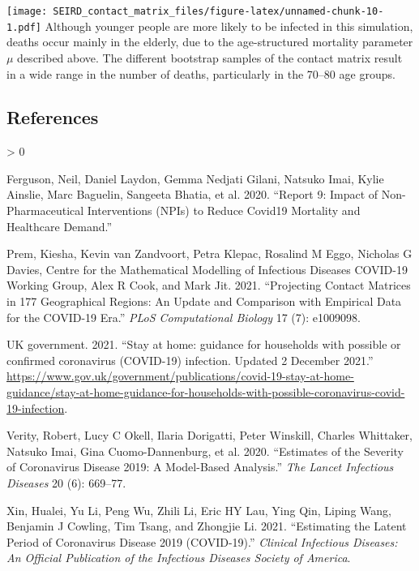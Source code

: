 \documentclass[
]{article}
\newlength{\cslhangindent}
\newenvironment{CSLReferences}[2] %
 {%
  \setlength{\parindent}{0pt}
  \ifodd #1 \everypar{\setlength{\hangindent}{\cslhangindent}}\ignorespaces\fi
  \ifnum #2 > 0
  \setlength{\parskip}{#2\baselineskip}
  \fi
 }%
 {}
\begin{document}
\texttt{[image: SEIRD\_contact\_matrix\_files/figure-latex/unnamed-chunk-10-1.pdf]}
Although younger people are more likely to be infected in this
simulation, deaths occur mainly in the elderly, due to the
age-structured mortality parameter \(\mu\) described above. The
different bootstrap samples of the contact matrix result in a wide range
in the number of deaths, particularly in the 70--80 age groups.

\hypertarget{references}{%
\subsection*{References}\label{references}}

\hypertarget{refs}{}
\begin{CSLReferences}{1}{0}
\leavevmode\hypertarget{ref-ferguson2020report}{}%
Ferguson, Neil, Daniel Laydon, Gemma Nedjati Gilani, Natsuko Imai, Kylie
Ainslie, Marc Baguelin, Sangeeta Bhatia, et al. 2020. {``Report 9:
Impact of Non-Pharmaceutical Interventions (NPIs) to Reduce Covid19
Mortality and Healthcare Demand.''}

\leavevmode\hypertarget{ref-prem2021projecting}{}%
Prem, Kiesha, Kevin van Zandvoort, Petra Klepac, Rosalind M Eggo,
Nicholas G Davies, Centre for the Mathematical Modelling of Infectious
Diseases COVID-19 Working Group, Alex R Cook, and Mark Jit. 2021.
{``Projecting Contact Matrices in 177 Geographical Regions: An Update
and Comparison with Empirical Data for the COVID-19 Era.''} \emph{PLoS
Computational Biology} 17 (7): e1009098.

\leavevmode\hypertarget{ref-stayathome2021}{}%
UK government. 2021. {``{Stay at home: guidance for households with
possible or confirmed coronavirus (COVID-19) infection. Updated 2
December 2021.}''}
\url{https://www.gov.uk/government/publications/covid-19-stay-at-home-guidance/stay-at-home-guidance-for-households-with-possible-coronavirus-covid-19-infection}.

\leavevmode\hypertarget{ref-verity2020estimates}{}%
Verity, Robert, Lucy C Okell, Ilaria Dorigatti, Peter Winskill, Charles
Whittaker, Natsuko Imai, Gina Cuomo-Dannenburg, et al. 2020.
{``Estimates of the Severity of Coronavirus Disease 2019: A Model-Based
Analysis.''} \emph{The Lancet Infectious Diseases} 20 (6): 669--77.

\leavevmode\hypertarget{ref-xin2021estimating}{}%
Xin, Hualei, Yu Li, Peng Wu, Zhili Li, Eric HY Lau, Ying Qin, Liping
Wang, Benjamin J Cowling, Tim Tsang, and Zhongjie Li. 2021.
{``Estimating the Latent Period of Coronavirus Disease 2019
(COVID-19).''} \emph{Clinical Infectious Diseases: An Official
Publication of the Infectious Diseases Society of America}.

\end{CSLReferences}
\end{document}
